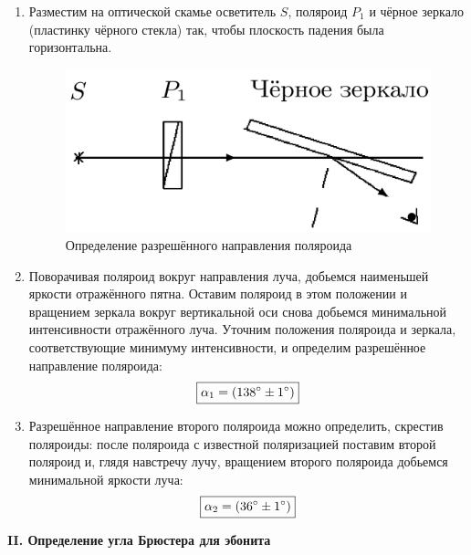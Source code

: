 \documentclass[a4paper,12pt]{article} %
\begin{document}
	\begin{enumerate}
		\item Разместим на оптической скамье осветитель $S$, поляроид $P_1$ и чёрное зеркало (пластинку чёрного стекла) так, чтобы плоскость падения была горизонтальна.
		
		\begin{figure}[h!]
			\centering
			\includegraphics[scale=0.5]{Pictures/I}
			\caption{Определение разрешённого направления поляроида}
		\end{figure}
		
		\item Поворачивая поляроид вокруг направления луча, добьемся наименьшей яркости отражённого пятна. Оставим поляроид в этом положении и вращением зеркала вокруг вертикальной оси снова добьемся минимальной интенсивности отражённого луча. Уточним положения поляроида и зеркала, соответствующие минимуму интенсивности, и определим разрешённое направление поляроида:
		\begin{equation*}
			\boxed{\alpha_1 = (138\degree \pm 1\degree)}
		\end{equation*}
	
		\item Разрешённое направление второго поляроида можно определить, скрестив поляроиды: после поляроида с известной поляризацией поставим второй поляроид и, глядя навстречу лучу, вращением второго поляроида добьемся минимальной яркости луча:
		\begin{equation*}
			\boxed{\alpha_2 = (36\degree \pm 1\degree)}
		\end{equation*}
	\end{enumerate}


	\begin{center}
		\textbf{II. Определение угла Брюстера для эбонита}
	\end{center}
\end{document}
